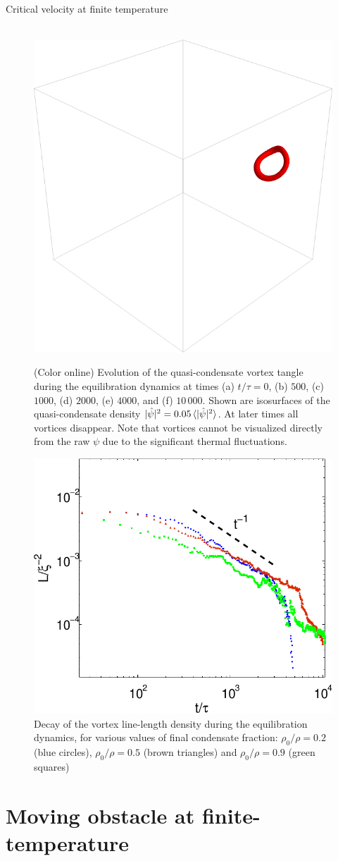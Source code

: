 \begin{chapter}{\label{cha:nonequib}Critical velocity at finite temperature}
\begin{figure}
    ~\includegraphics[width=0.3\linewidth]{nonequib/figures/IC/CF05-IC-t4000}
    \caption{(Color online) Evolution of the quasi-condensate vortex tangle during the equilibration dynamics at times (a) $t/\tau=0$, (b) $500$, (c) $1000$, (d) $2000$, (e) $4000$, and (f) $10\,000$.  Shown are isosurfaces of the quasi-condensate density $|\hat{\psi}|^2 = 0.05\braket{|\hat{\psi}|^2}$. At later times all vortices disappear.  Note that vortices cannot be visualized directly from the raw $\psi$ due to the significant thermal fluctuations.
}
    \label{fig:thermal}
\end{figure}


\begin{figure}
  \centering
    \includegraphics[width=0.45\linewidth]{nonequib/figures/ll_t_2}
    \caption{Decay of the vortex line-length density during the equilibration dynamics, for various values of final condensate fraction:  $\rho_0/\rho = 0.2$ (blue circles), $\rho_0/\rho = 0.5$ (brown triangles) and $\rho_0/\rho = 0.9$ (green squares)
}
    \label{fig:ll_t}
\end{figure}

\section{Moving obstacle at finite-temperature\label{sec:obstacle}}


\end{chapter}
